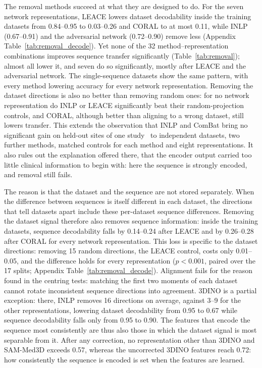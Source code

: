 \documentclass[11pt]{article}
\begin{document}
The removal methods succeed at what
they are designed to do. For the seven network representations, LEACE lowers
dataset decodability inside the training datasets from 0.84--0.95 to
0.03--0.26 and CORAL to at most 0.11, while INLP (0.67--0.91) and the
adversarial network (0.72--0.90) remove less (Appendix
Table~\ref{tab:removal_decode}). Yet none of the 32 method--representation
combinations improves sequence transfer significantly
(Table~\ref{tab:removal}); almost all lower it, and seven do so
significantly, mostly after LEACE and the adversarial network. The
single-sequence datasets show the same pattern, with every method lowering
accuracy for every network representation. Removing the dataset directions is
also no better than removing random ones: for no network representation do
INLP or LEACE significantly beat their random-projection controls, and CORAL,
although better than aligning to a wrong dataset, still lowers transfer.
This extends the observation that INLP and ComBat bring no significant gain
on held-out sites of one study~\cite{rahbar_frozen_2026} to independent
datasets, two further methods, matched controls for each method and eight
representations. It also rules out the explanation offered there, that the
encoder output carried too little clinical information to begin with: here
the sequence is strongly encoded, and removal still fails.

The reason is that the dataset and the sequence are not stored separately.
When the difference between sequences is itself different in each dataset,
the directions that tell datasets apart include these per-dataset sequence
differences. Removing the dataset signal therefore also removes sequence
information: inside the training datasets, sequence decodability falls by
0.14--0.24 after LEACE and by 0.26--0.28 after CORAL for every network
representation. This loss is specific to the dataset directions: removing 15
random directions, the LEACE control, costs only 0.01--0.05, and the
difference holds for every representation ($p<0.001$, paired over the 17
splits; Appendix Table~\ref{tab:removal_decode}). Alignment fails for the reason found in the centring tests:
matching the first two moments of each dataset cannot rotate inconsistent
sequence directions into agreement. 3DINO is a partial exception: there,
INLP removes 16 directions on average, against 3--9 for the other
representations, lowering dataset decodability from 0.95 to 0.67 while
sequence decodability falls only from 0.95 to 0.90. The features that encode
the sequence most consistently are thus also those in which the dataset
signal is most separable from it. After any correction, no representation
other than 3DINO and SAM-Med3D exceeds 0.57, whereas the uncorrected 3DINO
features reach 0.72: how consistently the sequence is encoded is set when the
features are learned.
\end{document}
